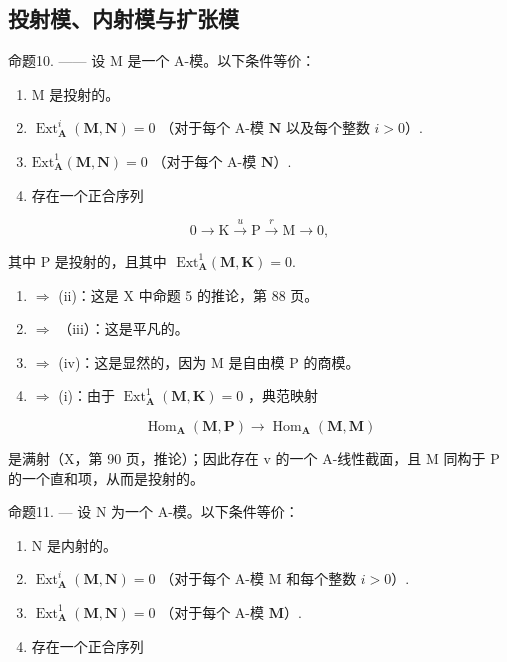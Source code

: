 \subsection{投射模、内射模与扩张模}

命题10. —— 设 M 是一个 A-模。以下条件等价：

\begin{enumerate}
\def\labelenumi{(\roman{enumi})}
\item
  M 是投射的。
\item
  \(\operatorname{Ext}_{\mathbf{A}}^{i}(\mathbf{M},\mathbf{N}) = 0\) （对于每个 A-模 \(\mathbf{N}\) 以及每个整数 \(i > 0\)）.
\item
  \(\mathrm{Ext}_{\mathbf{A}}^{1}(\mathbf{M},\mathbf{N}) = 0\) （对于每个 A-模 \(\mathbf{N}\)）.
\item
  存在一个正合序列
\end{enumerate}

\[
0 \rightarrow \mathrm{K} \xrightarrow {u} \mathrm{P} \xrightarrow {r} \mathrm{M} \rightarrow 0,
\]

\(\text{其中 P 是投射的，且其中 } \text{ Ext}_{\mathbf{A}}^{1}(\mathbf{M}, \mathbf{K}) = 0.\)

\begin{enumerate}
\def\labelenumi{(\roman{enumi})}
\item
  \(\Rightarrow\) (ii)：这是 X 中命题 5 的推论，第 88 页。
\item
  \(\Rightarrow\) （iii）：这是平凡的。
\item
  \(\Rightarrow\) (iv)：这是显然的，因为 M 是自由模 P 的商模。
\item
  \(\Rightarrow\) (i)：由于 \(\operatorname{Ext}_{\mathbf{A}}^{1}(\mathbf{M},\mathbf{K}) = 0\) ，典范映射
\end{enumerate}

\[
\operatorname{Hom} _ {\mathbf {A}} (\mathbf {M}, \mathbf {P}) \rightarrow \operatorname{Hom} _ {\mathbf {A}} (\mathbf {M}, \mathbf {M})
\]

是满射（X，第 90 页，推论）；因此存在 v 的一个 A-线性截面，且 M 同构于 P 的一个直和项，从而是投射的。

命题11. --- 设 N 为一个 A-模。以下条件等价：

\begin{enumerate}
\def\labelenumi{(\roman{enumi})}
\item
  N 是内射的。
\item
  \(\operatorname{Ext}_{\mathbf{A}}^{i}(\mathbf{M},\mathbf{N}) = 0\) （对于每个 A-模 M 和每个整数 \(i > 0\)）.
\item
  \(\operatorname{Ext}_{\mathbf{A}}^{1}(\mathbf{M},\mathbf{N}) = 0\) （对于每个 A-模 \(\mathbf{M}\)）.
\item
  存在一个正合序列
\end{enumerate}

